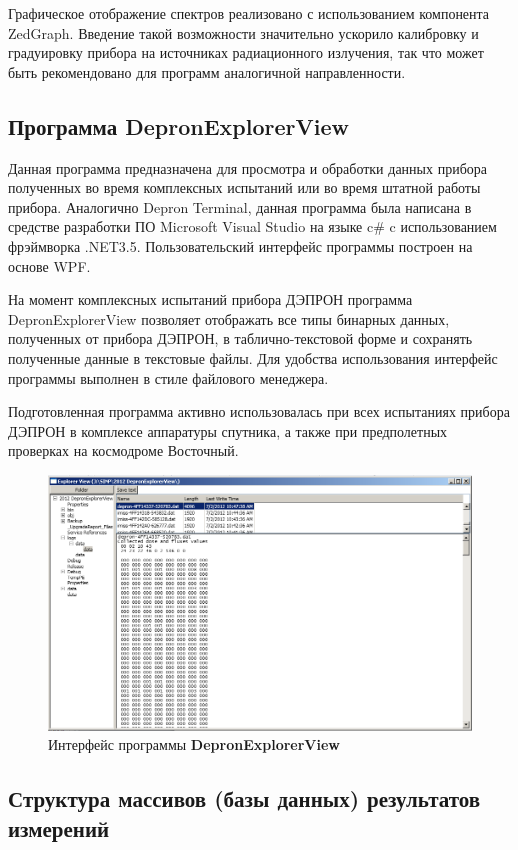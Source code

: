 Графическое отображение спектров реализовано с использованием компонента ZedGraph. Введение такой возможности значительно ускорило калибровку и градуировку прибора на источниках радиационного излучения, так что может быть рекомендовано для программ аналогичной направленности.

\subsection{Программа DepronExplorerView}

Данная программа предназначена для просмотра и обработки данных прибора полученных во время комплексных испытаний или во время штатной работы прибора. Аналогично Depron Terminal, данная программа была написана в средстве разработки ПО Microsoft Visual Studio на языке c\# c использованием фрэймворка .NET3.5. Пользовательский интерфейс программы построен на основе WPF.


На момент комплексных испытаний прибора ДЭПРОН программа DepronExplorerView позволяет отображать все типы бинарных данных, полученных от прибора ДЭПРОН, в таблично-текстовой форме и сохранять полученные данные в текстовые файлы. Для удобства использования интерфейс программы выполнен в стиле файлового менеджера. 

Подготовленная программа активно использовалась при всех испытаниях прибора ДЭПРОН в комплексе аппаратуры спутника, а также при предполетных проверках на космодроме Восточный.

\begin{figure}
\centering
\includegraphics[width=0.8\linewidth]{images/depron_explorer}
\caption{Интерфейс программы \textbf{DepronExplorerView}}
\label{fig:depron_explorer}
\end{figure}


\subsection{Структура массивов (базы данных) результатов измерений}


